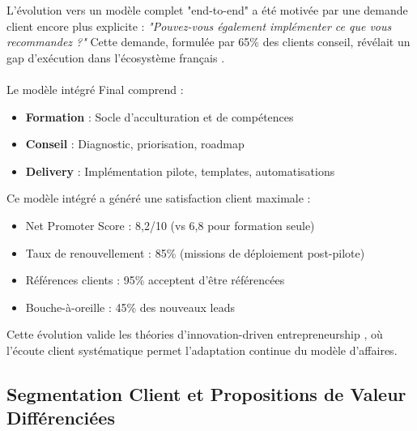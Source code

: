 L'évolution vers un modèle complet "end-to-end" a été motivée par une demande client encore plus explicite : \emph{"Pouvez-vous également implémenter ce que vous recommandez ?"} Cette demande, formulée par 65\% des clients conseil, révélait un gap d'exécution dans l'écosystème français \cite{luwai2025evolution}.
\\\\
Le modèle intégré Final comprend :
\begin{itemize}
    \item \textbf{Formation} : Socle d'acculturation et de compétences
    \item \textbf{Conseil} : Diagnostic, priorisation, roadmap
    \item \textbf{Delivery} : Implémentation pilote, templates, automatisations
\end{itemize}
\medskip
Ce modèle intégré a généré une satisfaction client maximale :
\begin{itemize}
    \item Net Promoter Score : 8,2/10 (vs 6,8 pour formation seule)
    \item Taux de renouvellement : 85\% (missions de déploiement post-pilote)
    \item Références clients : 95\% acceptent d'être référencées
    \item Bouche-à-oreille : 45\% des nouveaux leads
\end{itemize}
\medskip
Cette évolution valide les théories d'innovation-driven entrepreneurship \cite{aulet2013disciplined}, où l'écoute client systématique permet l'adaptation continue du modèle d'affaires.

\subsection{Segmentation Client et Propositions de Valeur Différenciées}

